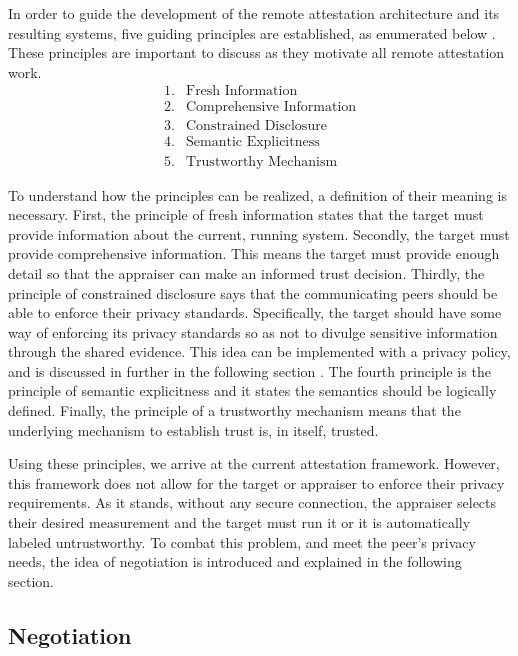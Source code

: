 \documentclass[12pt, letterpaper, twoside]{article}
\begin{document}
In order to guide the development of the remote attestation architecture and its resulting systems, five guiding principles are established, as enumerated below \cite{prin_remote}. These principles are important to discuss as they motivate all remote attestation work. 
\begin{align*}
  1. &\text{Fresh Information} \\
  2. &\text{Comprehensive Information} \\
  3. &\text{Constrained Disclosure} \\ 
  4. &\text{Semantic Explicitness} \\
  5. &\text{Trustworthy Mechanism} 
\end{align*}


To understand how the principles can be realized, a definition of their meaning is necessary. First, the principle of fresh information states that the target must provide information about the current, running system. Secondly, the target must provide comprehensive information. This means the target must provide enough detail so that the appraiser can make an informed trust decision. Thirdly, the principle of constrained disclosure says that the communicating peers should be able to enforce their privacy standards. Specifically, the target should have some way of enforcing its privacy standards so as not to divulge sensitive information through the shared evidence. This idea can be implemented with a privacy policy, and is discussed in further in the following section \cite{flexible}. The fourth principle is the principle of semantic explicitness and it states the semantics should be logically defined. Finally, the principle of a trustworthy mechanism means that the underlying mechanism to establish trust is, in itself, trusted.   

Using these principles, we arrive at the current attestation framework. However, this framework does not allow for the target or appraiser to enforce their privacy requirements. As it stands, without any secure connection, the appraiser selects their desired measurement and the target must run it or it is automatically labeled untrustworthy. To combat this problem, and meet the peer's privacy needs, the idea of negotiation is introduced and explained in the following section. 

\subsection{Negotiation}
\end{document}
